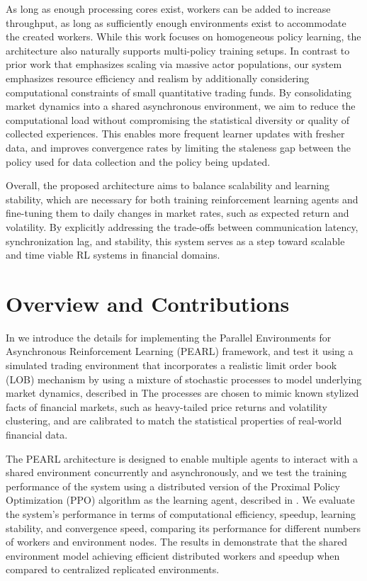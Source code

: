 As long as enough processing cores exist, workers can be added to increase throughput, as long
as sufficiently enough environments exist to accommodate the created workers.
While this work focuses on homogeneous policy learning, the architecture also naturally supports multi-policy training setups.
In contrast to prior work that emphasizes scaling via massive actor populations,
our system emphasizes resource efficiency and realism by additionally considering computational constraints of small quantitative trading funds.
By consolidating market dynamics into a shared asynchronous environment,
we aim to reduce the computational load without compromising the statistical diversity or quality of collected experiences.
This enables more frequent learner updates with fresher data, and improves convergence rates by limiting the staleness gap
between the policy used for data collection and the policy being updated.

Overall, the proposed architecture aims to balance scalability and learning stability,
which are necessary for both training reinforcement learning agents and fine-tuning them to daily changes
in market rates, such as expected return and volatility.
By explicitly addressing the trade-offs between communication latency, synchronization lag, and stability,
this system serves as a step toward scalable and time viable RL systems in financial domains.

\section{Overview and Contributions}
\label{sec:overview}

In  we introduce the details for implementing the Parallel Environments for Asynchronous Reinforcement Learning (PEARL) framework,
and test it using a simulated trading environment that incorporates a realistic limit order book (LOB) mechanism
by using a mixture of stochastic processes to model underlying market dynamics, described in 
The processes are chosen to mimic known stylized facts of financial markets, such as heavy-tailed price returns and
volatility clustering, and are calibrated to match the statistical properties of real-world financial data.

The PEARL architecture is designed to enable multiple agents to interact with a shared environment concurrently and asynchronously,
and we test the training performance of the system using a distributed version of the Proximal Policy Optimization (PPO) algorithm
as the learning agent, described in .
We evaluate the system's performance in terms of computational efficiency, speedup, learning stability, and convergence speed,
comparing its performance for different numbers of workers and environment nodes.
The results in  demonstrate that the shared environment model
achieving efficient distributed workers and speedup when compared to centralized replicated environments.
